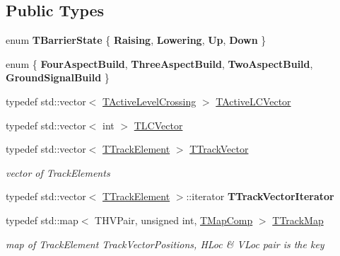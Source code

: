 \subsection*{Public Types}
\begin{DoxyCompactItemize}
\item 
\mbox{\label{class_t_track_a4c2e42d85ed9151b4983f079f11d6d79}} 
enum {\bfseries T\+Barrier\+State} \{ {\bfseries Raising}, 
{\bfseries Lowering}, 
{\bfseries Up}, 
{\bfseries Down}
 \}
\item 
\mbox{\label{class_t_track_a05bacf165698f9502dc7287b01ece848}} 
enum \{ {\bfseries Four\+Aspect\+Build}, 
{\bfseries Three\+Aspect\+Build}, 
{\bfseries Two\+Aspect\+Build}, 
{\bfseries Ground\+Signal\+Build}
 \}
\item 
typedef std\+::vector$<$ \mbox{\hyperlink{class_t_track_1_1_t_active_level_crossing}{T\+Active\+Level\+Crossing}} $>$ \mbox{\hyperlink{class_t_track_af124e944cfb44075f390cf5eceaf3e66}{T\+Active\+L\+C\+Vector}}
\item 
typedef std\+::vector$<$ int $>$ \mbox{\hyperlink{class_t_track_a84634d4f5d5ce1928526e8be27e74a72}{T\+L\+C\+Vector}}
\item 
\mbox{\label{class_t_track_ac64e15050a0faf07c1b7410d60cbcbe5}} 
typedef std\+::vector$<$ \mbox{\hyperlink{class_t_track_element}{T\+Track\+Element}} $>$ \mbox{\hyperlink{class_t_track_ac64e15050a0faf07c1b7410d60cbcbe5}{T\+Track\+Vector}}
\begin{DoxyCompactList}\small\item\em vector of Track\+Elements \end{DoxyCompactList}\item 
\mbox{\label{class_t_track_a87cc4e8b965e68fd9f02e3a1fc01b6bb}} 
typedef std\+::vector$<$ \mbox{\hyperlink{class_t_track_element}{T\+Track\+Element}} $>$\+::iterator {\bfseries T\+Track\+Vector\+Iterator}
\item 
\mbox{\label{class_t_track_ab03d3109c635a149c57812c89cec63a4}} 
typedef std\+::map$<$ T\+H\+V\+Pair, unsigned int, \mbox{\hyperlink{class_t_map_comp}{T\+Map\+Comp}} $>$ \mbox{\hyperlink{class_t_track_ab03d3109c635a149c57812c89cec63a4}{T\+Track\+Map}}
\begin{DoxyCompactList}\small\item\em map of Track\+Element Track\+Vector\+Positions, H\+Loc \& V\+Loc pair is the key \end{DoxyCompactList}\item 

\end{DoxyCompactItemize}
